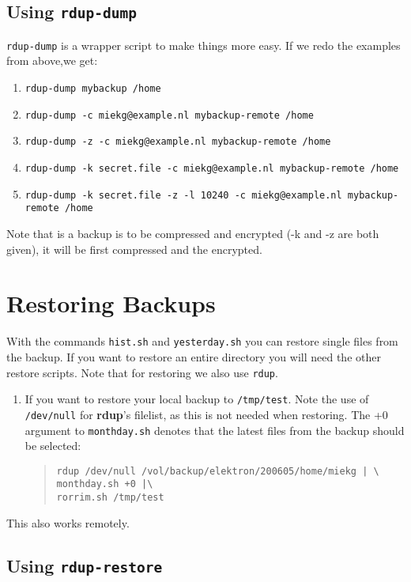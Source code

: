 \documentclass[a4paper, openany]{blocksbook}
\newcommand{\rdup}{\textbf{rdup}}
\newcommand{\cmd}[1]{\texttt{#1}}
\newcommand{\path}[1]{\texttt{#1}}
\begin{document}
\section{Using \cmd{rdup-dump}}
\cmd{rdup-dump} is a wrapper script to make things more easy. If we redo
the examples from above,we get:
\begin{enumerate}
\item{\cmd{rdup-dump mybackup /home}}
\item{\cmd{rdup-dump -c miekg@example.nl mybackup-remote /home}}
\item{\cmd{rdup-dump -z -c miekg@example.nl mybackup-remote /home}}
\item{\cmd{rdup-dump -k secret.file -c miekg@example.nl mybackup-remote /home}}
\item{\cmd{rdup-dump -k secret.file -z -l 10240 -c miekg@example.nl mybackup-remote /home}}
\end{enumerate}
Note that is a backup is to be compressed and encrypted (-k and -z are
both given), it will be first compressed and the encrypted.

\chapter{Restoring Backups}
With the commands \cmd{hist.sh} and \cmd{yesterday.sh} you can restore
single files from the backup. If you want to restore an entire directory
you will need the other restore scripts. Note that for restoring we
also use \cmd{rdup}.

\begin{enumerate}
\item
If you want to restore your local backup to \path{/tmp/test}.
Note the use of \path{/dev/null} for \rdup's filelist, as this is not
needed when restoring. The +0 argument to \cmd{monthday.sh} denotes
that the latest files from the backup should be selected:
\begin{quote}
\begin{verbatim}
rdup /dev/null /vol/backup/elektron/200605/home/miekg | \
monthday.sh +0 |\
rorrim.sh /tmp/test
\end{verbatim}
\end{quote}
\end{enumerate}

This also works remotely.


\section{Using \cmd{rdup-restore}}
\end{document}

